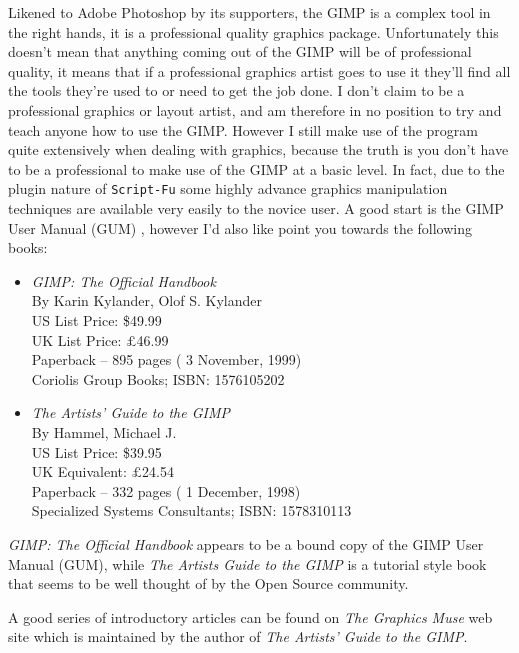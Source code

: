 \documentclass[twoside,11pt]{article}
\newcommand{\htmladdnormallink}[2]{#1}
\begin{document}
Likened to Adobe Photoshop by its supporters, the GIMP is a complex tool in the right hands, it is a professional quality graphics package. Unfortunately this doesn't mean that anything coming out of the GIMP will be of professional quality, it means that if a professional graphics artist goes to use it they'll find all the tools they're used to or need to get the job done. I don't claim to be a professional graphics or layout artist, and am therefore in no position to try and teach anyone how to use the GIMP. However I still make use of the program quite extensively when dealing with graphics, because the truth is you don't have to be a professional to make use of the GIMP at a basic level. In fact, due to the plugin nature of {\tt Script-Fu} some highly advance graphics manipulation techniques are available very easily to the novice user. A good start is the \htmladdnormallink{GIMP User Manual}{http://manual.gimp.org/} (GUM) , however I'd also like point you towards the following books:

\begin{itemize}
\item {\em GIMP: The Official Handbook}\\
By Karin Kylander, Olof S. Kylander\\ 
US List Price: \$49.99\\
UK List Price: $\pounds$46.99\\
Paperback -- 895 pages ( 3 November, 1999)\\ 
Coriolis Group Books; ISBN: 1576105202

\item {\em The Artists' Guide to the GIMP}\\ 
By Hammel, Michael J.\\
US List Price: \$39.95\\
UK Equivalent: $\pounds$24.54\\
Paperback -- 332 pages ( 1 December, 1998)\\ 
Specialized Systems Consultants; ISBN: 1578310113

\end{itemize}

{\em GIMP: The Official Handbook} appears to be a bound copy of the \htmladdnormallink{GIMP User Manual}{http://manual.gimp.org/} (GUM), while {\em The Artists Guide to the GIMP} is a tutorial style book that seems to be well thought of by the Open Source community.

A good series of introductory articles can be found on \htmladdnormallink{{\em The Graphics Muse}}{http://graphics-muse.com/} web site which is maintained by the author of {\em The Artists' Guide to the GIMP}.
\end{document}
